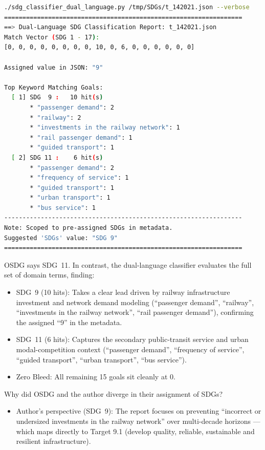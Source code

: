 \begin{casestudySection}
\begin{lstlisting}[language={bash}, basicstyle=\footnotesize, escapechar=|, breaklines=true,
    postbreak=\usebox{\lstbreakbox}, caption={Program's output}, label=lst:t_142021Output]
./sdg_classifier_dual_language.py /tmp/SDGs/t_142021.json --verbose
=================================================================
==> Dual-Language SDG Classification Report: t_142021.json
Match Vector (SDG 1 - 17):
[0, 0, 0, 0, 0, 0, 0, 0, 10, 0, 6, 0, 0, 0, 0, 0, 0]

Assigned value in JSON: "9"

Top Keyword Matching Goals:
  [ 1] SDG  9 :   10 hit(s)
       * "passenger demand": 2
       * "railway": 2
       * "investments in the railway network": 1
       * "rail passenger demand": 1
       * "guided transport": 1
  [ 2] SDG 11 :    6 hit(s)
       * "passenger demand": 2
       * "frequency of service": 1
       * "guided transport": 1
       * "urban transport": 1
       * "bus service": 1
-----------------------------------------------------------------
Note: Scoped to pre-assigned SDGs in metadata.
Suggested 'SDGs' value: "SDG 9"
=================================================================
\end{lstlisting}

OSDG says \gls{SDG}~11. In contrast, the dual-language classifier evaluates the full set of domain terms, finding:
\begin{itemize}
    \item \gls{SDG}~9 (10 hits): Takes a clear lead driven by railway infrastructure investment and network demand modeling (\enquote{passenger demand}, \enquote{railway}, \enquote{investments in the railway network}, \enquote{rail passenger demand}), confirming the assigned \enquote{9} in the metadata.

    \item \gls{SDG}~11 (6 hits): Captures the secondary public-transit service and urban modal-competition context (\enquote{passenger demand}, \enquote{frequency of service}, \enquote{guided transport}, \enquote{urban transport}, \enquote{bus service}).

    \item Zero Bleed: All remaining 15 goals sit cleanly at 0.
\end{itemize}

Why did OSDG and the author diverge in their assignment of \glspl{SDG}?
\begin{itemize}
    \item Author's perspective (\gls{SDG}~9): The report focuses on preventing \enquote{incorrect or undersized investments in the railway network} over multi-decade horizons --- which maps directly to Target 9.1 (develop quality, reliable, sustainable and resilient infrastructure).


\end{itemize}
\end{casestudySection}
